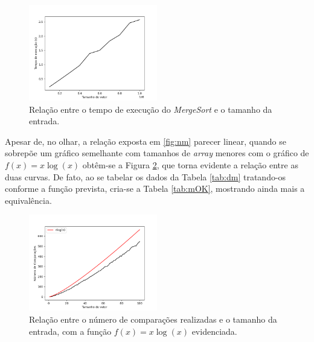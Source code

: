 \documentclass[12pt,a4paper,oneside]{article}
\begin{document}
\begin{figure}[H]
\begin{center}
    \includegraphics[width=0.5\textwidth]{FigTM.png} 
\end{center}
\caption{Relação entre o tempo de execução do \textit{MergeSort} e o tamanho da entrada.}
\label{fig:tm}
\end{figure}

\quad Apesar de, no olhar, a relação exposta em \ref{fig:nm} parecer linear, quando se sobrepõe um gráfico semelhante com tamanhos de \textit{array} menores com o gráfico de $f(x)=x\log{(x)}$ obtêm-se a Figura \ref{fig:mOK}, que torna evidente a relação entre as duas curvas. De fato, ao se tabelar os dados da Tabela \ref{tab:dm} tratando-os conforme a função prevista, cria-se a Tabela \ref{tab:mOK}, mostrando ainda mais a equivalência.

\begin{figure}[H]
\begin{center}
    \includegraphics[width=0.5\textwidth]{FigMnlogn.png} 
\end{center}
\caption{Relação entre o número de comparações realizadas e o tamanho da entrada, com a função $f(x)=x\log{(x)}$ evidenciada.}
\label{fig:mOK}
\end{figure}
\end{document}
